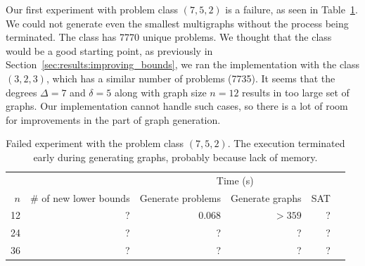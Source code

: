 Our first experiment with problem class $(7,5,2)$ is a failure, as seen in Table~\ref{tbl:results:new_lower_bounds_for_classes:7_5_2}.
We could not generate even the smallest multigraphs without the process being terminated.
The class has 7770 unique problems.
We thought that the class would be a good starting point, as previously in Section~\ref{sec:results:improving_bounds}, we ran the implementation with the class $(3,2,3)$, which has a similar number of problems (7735).
It seems that the degrees $\Delta=7$ and $\delta=5$ along with graph size $n=12$ results in too large set of graphs.
Our implementation cannot handle such cases, so there is a lot of room for improvements in the part of graph generation.
\begin{table}[H]
    \centering
    \begin{tabular}{rrrrrr}
        \toprule
        && \multicolumn{3}{c}{Time (s)} \\
        \cmidrule{3-5}
        $n$ & \# of new lower bounds & Generate problems & Generate graphs & SAT\\
        \midrule
        12  & ?  & 0.068  & $>359$  & ?\\
        24 & ? & ? & ? & ? \\
        36 & ? & ? & ? & ? \\
        \bottomrule
    \end{tabular}
    \caption{%
    Failed experiment with the problem class $(7,5,2)$.
    The execution terminated early during generating graphs, probably because lack of memory.
    }
    \label{tbl:results:new_lower_bounds_for_classes:7_5_2}
\end{table}

